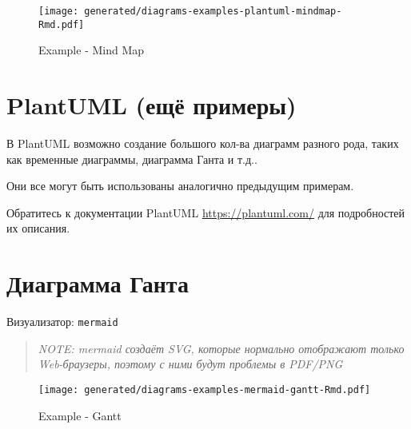 \documentclass[12pt,a4paper,12pt,oneside,openany]{book}
\begin{document}
\begin{figure}
\centering
\texttt{[image: generated/diagrams-examples-plantuml-mindmap-Rmd.pdf]}
\caption{Example - Mind Map}
\end{figure}

\newpage

\section{PlantUML (ещё примеры)}\label{plantuml--}

В PlantUML возможно создание большого кол-ва диаграмм разного рода, таких как временные диаграммы, диаграмма Ганта и т.д..

Они все могут быть использованы аналогично предыдущим примерам.

Обратитесь к документации PlantUML \url{https://plantuml.com/} для подробностей их описания.

\newpage

\section{Диаграмма Ганта}\label{-}

Визуализатор: \texttt{mermaid}

\begin{quote}
\emph{NOTE: mermaid создаёт SVG, которые нормально отображают только Web-браузеры, поэтому с ними будут проблемы в PDF/PNG}
\end{quote}

\begin{figure}
\centering
\texttt{[image: generated/diagrams-examples-mermaid-gantt-Rmd.pdf]}
\caption{Example - Gantt}
\end{figure}


\end{document}
